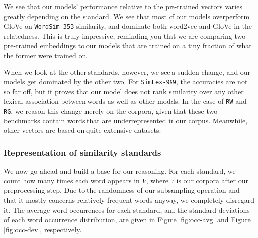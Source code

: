 We see that our models' performance relative to the pre-trained vectors varies greatly depending on the standard. We see that most of our models overperform GloVe on \verb|WordSim-353| similarity, and dominate both word2vec and GloVe in the relatedness. This is truly impressive, reminding you that we are comparing two pre-trained embeddings to our models that are trained on a tiny fraction of what the former were trained on. 

When we look at the other standards, however, we see a sudden change, and our models get dominated by the other two. For \verb|SimLex-999|, the accuracies are not so far off, but it proves that our model does not rank similarity over any other lexical association between words as well as other models. In the case of \verb|RW| and \verb|RG|, we reason this change merely on the corpora, given that these two benchmarks contain words that are underrepresented in our corpus. Meanwhile, other vectors are based on quite extensive datasets.

\subsubsection{Representation of similarity standards}
We now go ahead and build a base for our reasoning. For each standard, we count how many times each word appears in $V$, where $V$ is our corpora after our preprocessing step. Due to the randomness of our subsampling operation and that it mostly concerns relatively frequent words anyway, we completely disregard it. The average word occurrences for each standard, and the standard deviations of each word occurrence distribution, are given in Figure \ref{fig:occ-avg} and Figure \ref{fig:occ-dev}, respectively. 

